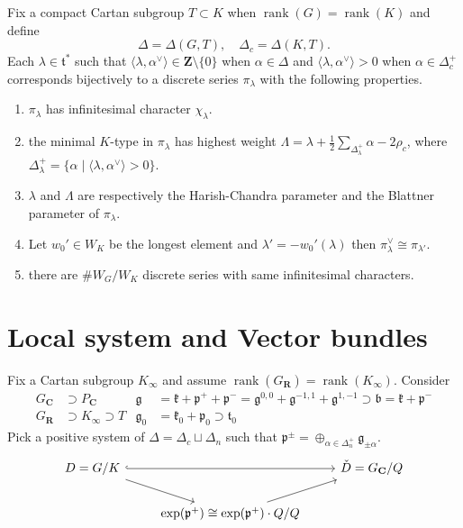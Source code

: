 \documentclass[leqno]{amsart}
\newcommand{\Z}{{\mathbf{Z}}}
\newcommand{\C}{\mathbf C}
\newcommand{\R}{\mathbf R}
\newcommand{\1}{\mathbf{1}}
\newcommand{\rfg}{\mathfrak{g}_0}
\newcommand{\cfg}{\mathfrak{g}}
\newcommand{\rfk}{\mathfrak{k}_0}
\newcommand{\cfk}{\mathfrak{k}}
\newcommand{\rfp}{\mathfrak{p}_0}
\newcommand{\cfp}{\mathfrak{p}}
\newcommand{\rft}{\mathfrak{t}_0}
\newcommand{\cft}{\mathfrak{t}}
\newcommand{\rt}{\Delta}
\DeclareMathOperator{\rank}{rank}
\theoremstyle{definition}
\theoremstyle{remark}
\begin{document}
Fix a compact Cartan subgroup $T\subset K$
when $\rank(G)=\rank(K)$ and define
\[
    \rt=\rt(G,T),\quad
    \rt_c=\rt(K,T).
\]
Each $\lambda\in \cft^*$
such that 
$\langle \lambda,\alpha^\vee\rangle\in \Z\setminus\{0\}$
when $\alpha\in \rt$ and
$\langle \lambda, \alpha^\vee\rangle>0$
when $\alpha\in\rt_c^+$
corresponds bijectively to 
a discrete series $\pi_\lambda$ 
with the following properties.
\begin{enumerate}
    \item $\pi_\lambda$ has infinitesimal character $\chi_\lambda$.
    \item the minimal $K$-type in  $\pi_\lambda$
    has highest weight
    $\Lambda=\lambda
    +\frac{1}{2}\sum_{\Delta_\lambda^+}\alpha-2\rho_c$, 
    where $\Delta_\lambda^+=
    \{\alpha\mid \langle\lambda,\alpha^\vee\rangle>0\}$.
    \item $\lambda$ and  $\Lambda$
    are respectively the Harish-Chandra parameter
    and the Blattner parameter of  $\pi_\lambda$.
    \item Let $w_0'\in W_K$ be the longest element
	    and $\lambda'=-w_0'(\lambda)$
	    then  $\pi_\lambda^\vee\cong \pi_{\lambda'}$.
    \item there are $\# W_G/W_K$ discrete series 
	    with same infinitesimal characters.
\end{enumerate}


\section{Local system and Vector bundles}

Fix a Cartan subgroup $K_\infty$ and assume 
$\rank(G_\R)=\rank(K_\infty)$.
Consider
\begin{align*}
	G_\C&\supset P_\C & 
	\cfg&=\cfk+\cfp^++\cfp^-
	=\cfg^{0,0}+
	\cfg^{-1,1}+
	\cfg^{1,-1} \supset
	\mathfrak{b}=\cfk+\cfp^-\\
	G_\R&\supset K_\infty\supset T &
	\rfg&=\rfk+\rfp\supset \rft
\end{align*}
Pick a positive system of $\rt=\rt_c\sqcup\rt_n$
such that $\cfp^\pm=\oplus_{\alpha\in \Delta_n^+}\cfg_{\pm\alpha}$.
 \[
	 \begin{tikzcd}
		 D=G/K\arrow[rr,hookrightarrow]
		 \arrow[dr]
		 && \check{D}=G_\C/Q\\
		 &
		 \exp(\cfp^+)\cong
		 \exp(\cfp^+)\cdot Q/Q\arrow[ur]&
	 \end{tikzcd}
\]
\end{document}
